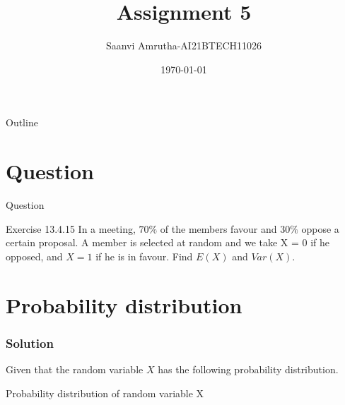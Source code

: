 \documentclass{beamer}
\title{Assignment 5}
\author{Saanvi Amrutha-AI21BTECH11026}
\date{\today}
\begin{document}
\begin{frame}
    \titlepage 
\end{frame}

\logo{}

\begin{frame}{Outline}
    \tableofcontents
\end{frame}

\section{Question}
\begin{frame}{Question}
    \begin{block}{Exercise 13.4.15}
       In a meeting, $70\%$ of the members favour and $30\%$ oppose a certain proposal.
A member is selected at random and we take X = 0 if he opposed, and $X = 1$ if
he is in favour. Find $E(X)$ and $Var (X)$.
    \end{block}
\end{frame}

\section{Probability distribution}
\begin{frame}
\frametitle{Solution}
Given that the random variable $X$ has the following probability distribution.\\
\begin{table}[h]
\begin{center}
    
	\vspace{5pt}
\caption{Probability distribution of random variable X}
\label{table:table1}
\end{center}
\end{table}
\end{frame}
\end{document}
